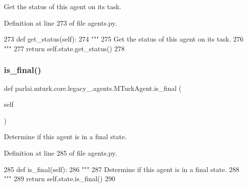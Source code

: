 \begin{DoxyVerb}Get the status of this agent on its task.
\end{DoxyVerb}
 

Definition at line 273 of file agents.\+py.


\begin{DoxyCode}
273     \textcolor{keyword}{def }get\_status(self):
274         \textcolor{stringliteral}{"""}
275 \textcolor{stringliteral}{        Get the status of this agent on its task.}
276 \textcolor{stringliteral}{        """}
277         \textcolor{keywordflow}{return} self.state.get\_status()
278 
\end{DoxyCode}
\mbox{\label{classparlai_1_1mturk_1_1core_1_1legacy__2018_1_1agents_1_1MTurkAgent_a45ac31e91fb1d40d2a4907e56e13cce6}} 
\subsubsection{\texorpdfstring{is\+\_\+final()}{is\_final()}}
{\footnotesize\ttfamily def parlai.\+mturk.\+core.\+legacy\+\_.\+agents.\+M\+Turk\+Agent.\+is\+\_\+final (\begin{DoxyParamCaption}\item[{}]{self }\end{DoxyParamCaption})}

\begin{DoxyVerb}Determine if this agent is in a final state.
\end{DoxyVerb}
 

Definition at line 285 of file agents.\+py.


\begin{DoxyCode}
285     \textcolor{keyword}{def }is\_final(self):
286         \textcolor{stringliteral}{"""}
287 \textcolor{stringliteral}{        Determine if this agent is in a final state.}
288 \textcolor{stringliteral}{        """}
289         \textcolor{keywordflow}{return} self.state.is\_final()
290 
\end{DoxyCode}
\mbox{\label{classparlai_1_1mturk_1_1core_1_1legacy__2018_1_1agents_1_1MTurkAgent_a575ea7912571bb6e565f9e12b2c19ea6}} 
